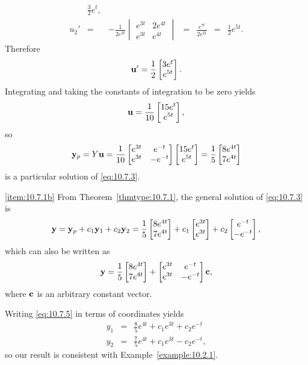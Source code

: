 \documentclass{ximera}
\begin{document}
\begin{example}
\begin{explanation}
$$\begin{array}{ccccccl}
&\frac{3}{2}e^t,\\
u_2'&=&-\frac{1}{2e^{2t}}
\begin{vmatrix}e^{3t}&2e^{4t}\\e^{3t}&e^{4t}
\end{vmatrix}&=&\frac{e^{7t}}{2e^{2t}}&=&\frac{1}{2}e^{5t}.
\end{array}
$$
 Therefore
$$
{\bf
u}'=\frac{1}{2}\begin{bmatrix}3e^t\\e^{5t}\end{bmatrix}.
$$
Integrating and taking the constants of integration to be zero yields
$$
{\bf
u}=\frac{1}{10}\begin{bmatrix}15e^t\\e^{5t}\end{bmatrix},
$$
so
$$
{\bf y}_p=Y{\bf u}=
\frac{1}{10}\begin{bmatrix}e^{3t}&e^{-t}\\
e^{3t}&-e^{-t}\end{bmatrix}
\begin{bmatrix}15e^t\\e^{5t}\end{bmatrix}
=\frac{1}{5}\begin{bmatrix}8e^{4t}\\7e^{4t}\end{bmatrix}
$$
is a particular solution of  \eqref{eq:10.7.3}.


\ref{item:10.7.1b} From Theorem~\ref{thmtype:10.7.1}, the general solution of
\eqref{eq:10.7.3} is
\begin{equation} \label{eq:10.7.5}
{\bf y}={\bf y}_p+c_1{\bf y}_1+c_2{\bf y}_2=
\frac{1}{5}\begin{bmatrix}8e^{4t}\\7e^{4t}\end{bmatrix}
+c_1\begin{bmatrix}e^{3t}\\e^{3t}\end{bmatrix}
+c_2\begin{bmatrix}e^{-t}\\-e^{-t}\end{bmatrix},
\end{equation}
which can also be written as
$$
{\bf y}=
\frac{1}{5}\begin{bmatrix}8e^{4t}\\7e^{4t}\end{bmatrix}
+\begin{bmatrix}e^{3t}&e^{-t}\\e^{3t}&-e^{-t}\end{bmatrix}{\bf c},
$$
where ${\bf c}$ is an arbitrary constant vector.

Writing \eqref{eq:10.7.5} in terms of
coordinates yields
\begin{eqnarray*}
y_1&=&\frac{8}{5}e^{4t}+c_1e^{3t}+c_2e^{-t}\\
y_2&=&\frac{7}{5}e^{4t}+c_1e^{3t}-c_2e^{-t},
\end{eqnarray*}
so our result is consistent with Example~\ref{example:10.2.1}.
\end{explanation}
\end{example}
\end{document}
